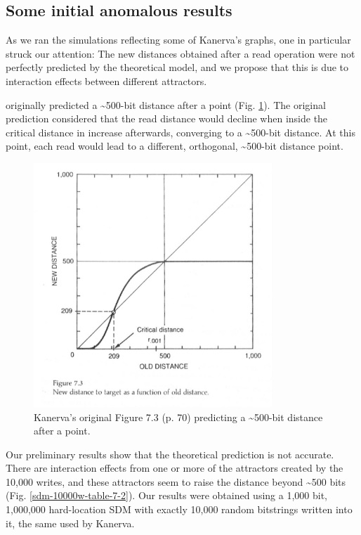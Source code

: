 \subsection{Some initial anomalous results}

As we ran the simulations reflecting some of Kanerva's graphs, one in particular struck our attention: The new distances obtained after a read operation were not perfectly predicted by the theoretical model, and we propose that this is due to interaction effects between different attractors.

\citet{Kanerva1988} originally predicted a \textasciitilde 500-bit distance after a point (Fig. \ref{kanerva-table-7-2}). The original prediction considered that the read distance would decline when inside the critical distance in increase afterwards, converging to a \textasciitilde 500-bit distance.  At this point, each read would lead to a different, orthogonal, \textasciitilde 500-bit distance point.

\begin{figure}[h]
\centering\includegraphics[width=0.8\textwidth]{images02/kanerva-table-7-2-original.png}
\caption{Kanerva's original Figure 7.3 (p. 70) predicting a \textasciitilde 500-bit distance after a point.
\label{kanerva-table-7-2}}
\end{figure}

Our preliminary results show that the theoretical prediction is not accurate.  There are interaction effects from one or more of the attractors created by the 10,000 writes, and these attractors seem to raise the distance beyond \textasciitilde 500 bits (Fig. \ref{sdm-10000w-table-7-2}). Our results were obtained using a 1,000 bit, 1,000,000 hard-location SDM with exactly 10,000 random bitstrings written into it, the same used by Kanerva.

